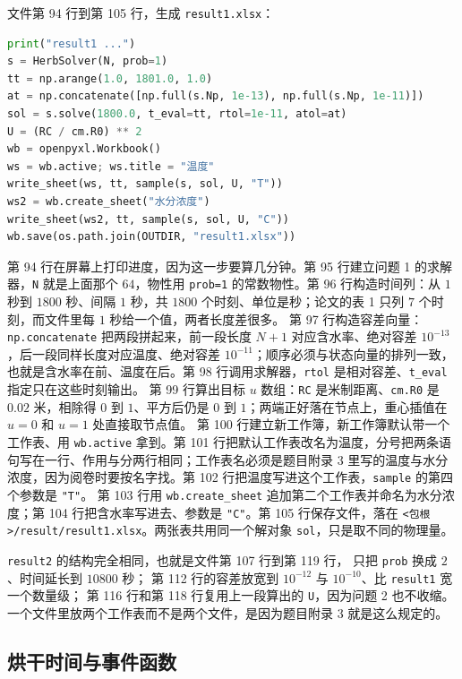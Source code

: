 文件第 94 行到第 105 行，生成 \texttt{result1.xlsx}：

\begin{lstlisting}[language=Python]
print("result1 ...")
s = HerbSolver(N, prob=1)
tt = np.arange(1.0, 1801.0, 1.0)
at = np.concatenate([np.full(s.Np, 1e-13), np.full(s.Np, 1e-11)])
sol = s.solve(1800.0, t_eval=tt, rtol=1e-11, atol=at)
U = (RC / cm.R0) ** 2
wb = openpyxl.Workbook()
ws = wb.active; ws.title = "温度"
write_sheet(ws, tt, sample(s, sol, U, "T"))
ws2 = wb.create_sheet("水分浓度")
write_sheet(ws2, tt, sample(s, sol, U, "C"))
wb.save(os.path.join(OUTDIR, "result1.xlsx"))
\end{lstlisting}

第 94 行在屏幕上打印进度，因为这一步要算几分钟。第 95 行建立问题 1 的求解器，\texttt{N} 就是上面那个 $64$，物性用 \texttt{prob=1} 的常数物性。第 96 行构造时间列：从 $1$ 秒到 $1800$ 秒、间隔 $1$ 秒，共 $1800$ 个时刻、单位是秒；论文的表 1 只列 $7$ 个时刻，而文件里每 $1$ 秒给一个值，两者长度差很多。
第 97 行构造容差向量：\texttt{np.concatenate} 把两段拼起来，前一段长度 $N+1$ 对应含水率、绝对容差 $10^{-13}$，后一段同样长度对应温度、绝对容差 $10^{-11}$；顺序必须与状态向量的排列一致，也就是含水率在前、温度在后。第 98 行调用求解器，\texttt{rtol} 是相对容差、\texttt{t\_eval} 指定只在这些时刻输出。
第 99 行算出目标 $u$ 数组：\texttt{RC} 是米制距离、\texttt{cm.R0} 是 $0.02$ 米，相除得 $0$ 到 $1$、平方后仍是 $0$ 到 $1$；两端正好落在节点上，重心插值在 $u=0$ 和 $u=1$ 处直接取节点值。
第 100 行建立新工作簿，新工作簿默认带一个工作表、用 \texttt{wb.active} 拿到。第 101 行把默认工作表改名为温度，分号把两条语句写在一行、作用与分两行相同；工作表名必须是题目附录 3 里写的温度与水分浓度，因为阅卷时要按名字找。第 102 行把温度写进这个工作表，\texttt{sample} 的第四个参数是 \texttt{"T"}。
第 103 行用 \texttt{wb.create\_sheet} 追加第二个工作表并命名为水分浓度；第 104 行把含水率写进去、参数是 \texttt{"C"}。第 105 行保存文件，落在 \texttt{<包根>/result/result1.xlsx}。两张表共用同一个解对象 \texttt{sol}，只是取不同的物理量。

\texttt{result2} 的结构完全相同，也就是文件第 107 行到第 119 行，
只把 \texttt{prob} 换成 $2$、时间延长到 $10800$ 秒；
第 112 行的容差放宽到 $10^{-12}$ 与 $10^{-10}$、比 \texttt{result1} 宽一个数量级；
第 116 行和第 118 行复用上一段算出的 \texttt{U}，因为问题 2 也不收缩。
一个文件里放两个工作表而不是两个文件，是因为题目附录 3 就是这么规定的。

\subsection{烘干时间与事件函数}

